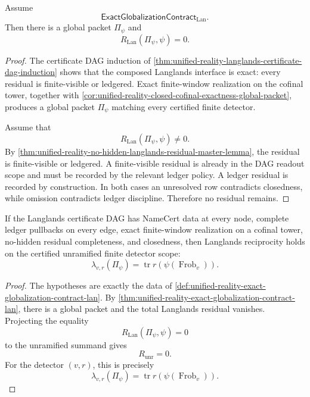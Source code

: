 \begin{theorem}
\label{thm:unified-reality-exact-globalization-contract-lan}
Assume
$$
\mathsf{ExactGlobalizationContract}_{\mathrm{Lan}}.
$$
Then there is a global packet $\Pi_\psi$ and
$$
R_{\mathrm{Lan}}(\Pi_\psi,\psi)=0.
$$
\end{theorem}
\begin{proof}
The certificate DAG induction of
\autoref{thm:unified-reality-langlands-certificate-dag-induction}
shows that the composed Langlands interface is exact: every residual is
finite-visible or ledgered. Exact finite-window realization on the
cofinal tower, together with
\autoref{cor:unified-reality-closed-cofinal-exactness-global-packet},
produces a global packet $\Pi_\psi$ matching every certified finite
detector.

Assume that
$$
R_{\mathrm{Lan}}(\Pi_\psi,\psi)\ne0.
$$
By
\autoref{thm:unified-reality-no-hidden-langlands-residual-master-lemma},
the residual is finite-visible or ledgered. A finite-visible residual
is already in the DAG readout scope and must be recorded by the relevant
ledger policy. A ledger residual is recorded by construction. In both
cases an unresolved row contradicts closedness, while omission
contradicts ledger discipline. Therefore no residual remains.
\end{proof}

\begin{theorem}
\label{thm:unified-reality-bedc-langlands-exact-closure}
If the Langlands certificate DAG has NameCert data at every node,
complete ledger pullbacks on every edge, exact finite-window
realization on a cofinal tower, no-hidden residual completeness, and
closedness, then Langlands reciprocity holds on the certified
unramified finite detector scope:
$$
\lambda_{v,r}(\Pi_\psi)
=
\operatorname{tr}r(\psi(\operatorname{Frob}_v)).
$$
\end{theorem}
\begin{proof}
The hypotheses are exactly the data of
\autoref{def:unified-reality-exact-globalization-contract-lan}. By
\autoref{thm:unified-reality-exact-globalization-contract-lan}, there
is a global packet and the total Langlands residual vanishes. Projecting
the equality
$$
R_{\mathrm{Lan}}(\Pi_\psi,\psi)=0
$$
to the unramified summand gives
$$
R_{\mathrm{unr}}=0.
$$
For the detector $(v,r)$, this is precisely
$$
\lambda_{v,r}(\Pi_\psi)
=
\operatorname{tr}r(\psi(\operatorname{Frob}_v)).
$$
\end{proof}


